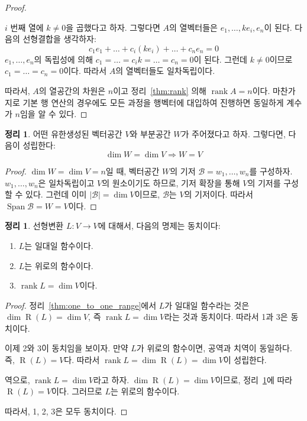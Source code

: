 \documentclass[unfonts,oneside,a4paper]{oblivoir}
\theoremstyle{definition}
\theoremstyle{theorem}
\newtheorem{theorem}[definition]{정리}
\theoremstyle{theorem}
\theoremstyle{remark}
\theoremstyle{remark}
\theoremstyle{remark}
\theoremstyle{remark}
\renewcommand{\vec}[1]{\bm{\mathit{#1}}}
\newcommand{\vecz}{\bm{\mathrm{0}}}
\DeclareMathOperator{\Span}{Span}
\DeclareMathOperator{\Range}{R}
\DeclareMathOperator{\rank}{rank}
\begin{document}
\begin{proof}
\begin{enumerate}
            $i$ 번째 열에 $k \neq 0$을 곱했다고 하자.
            그렇다면 $A$의 열벡터들은 $\vec e_1, \dots, k \vec e_i, \vec e_n$이 된다.
            다음의 선형결합을 생각하자:
            \begin{equation*}
                c_1 \vec e_1 + \dots + c_i (k \vec e_i) + \dots + c_n \vec e_n = \vecz
            \end{equation*}
            $\vec e_1, \dots, \vec e_n$의 독립성에 의해 $c_1 = \dots = c_i k = \dots = c_n = 0$이 된다.
            그런데 $k \neq 0$이므로 $c_1 = \dots = c_n = 0$이다.
            따라서 $A$의 열벡터들도 일차독립이다.
    \end{enumerate}
    따라서, $A$의 열공간의 차원은 $n$이고 정리~\ref{thm:rank} 의해 $\rank A = n$이다.
    마찬가지로 기본 행 연산의 경우에도 모든 과정을 행벡터에 대입하여 진행하면 동일하게 계수가 $n$임을 알 수 있다.
\end{proof}

\begin{theorem}\label{thm17}
    어떤 유한생성된 벡터공간 $V$와 부분공간 $W$가 주어졌다고 하자.
    그렇다면, 다음이 성립한다:
    \begin{equation*}
        \dim W = \dim V \Rightarrow W = V
    \end{equation*}
\end{theorem}

\begin{proof}
    $\dim W = \dim V = n$일 때, 벡터공간 $W$의 기저 $\mathcal B = \vec w_1, \dots, \vec w_n$를 구성하자.
    $\vec w_1, \dots, \vec w_n$은 일차독립이고 $V$의 원소이기도 하므로, 기저 확장을 통해 $V$의 기저를 구성할 수 있다.
    그런데 이미 $|\mathcal B| = \dim V$이므로, $\mathcal B$는 $V$의 기저이다.
    따라서 $\Span \mathcal B = W = V$이다.
\end{proof}

\begin{theorem} \label{thm:onto}
    선형변환 $L: V \rightarrow V$에 대해서, 다음의 명제는 동치이다:
    \begin{enumerate}
        \item $L$는 일대일 함수이다.
        \item $L$는 위로의 함수이다.
        \item $\rank L = \dim V$이다.
    \end{enumerate}
\end{theorem}

\begin{proof}
    정리~\ref{thm:one_to_one_range}에서 $L$가 일대일 함수라는 것은 $\dim \Range(L) = \dim V$, 즉 $\rank L = \dim V$라는 것과 동치이다.
    따라서 1과 3은 동치이다.

    이제 2와 3이 동치임을 보이자.
    만약 $L$가 위로의 함수이면, 공역과 치역이 동일하다.
    즉, $\Range(L) = V$다.
    따라서 $\rank L = \dim \Range(L) = \dim V$이 성립한다.

    역으로, $\rank L = \dim V$라고 하자.
    $\dim \Range(L) = \dim V$이므로, 정리~\ref{thm17}에 따라 $\Range(L) = V$이다.
    그러므로 $L$는 위로의 함수이다.

    따라서, 1, 2, 3은 모두 동치이다.
\end{proof}
\end{document}
